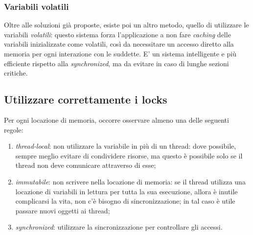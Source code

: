 \subsubsection{Variabili volatili}
Oltre alle soluzioni già proposte, esiste poi un altro metodo, quello di utilizzare le variabili \textit{volatili}: questo sistema forza l'applicazione a non fare \textit{caching} delle variabili inizializzate come volatili, così da necessitare un accesso diretto alla memoria per ogni interazione con le suddette. E' un sistema intelligente e più efficiente rispetto alla \textit{synchronized}, ma da evitare in caso di lunghe sezioni critiche.

\subsection{Utilizzare correttamente i locks}
Per ogni locazione di memoria, occorre osservare almeno una delle seguenti regole:
\begin{enumerate}
	\item \textit{thread-local}: non utilizzare la variabile in più di un thread:
	dove possibile, sempre meglio evitare di condividere risorse, ma questo è possibile solo se il thread non deve comunicare attraverso di esse;
	\item \textit{immutabile}: non scrivere nella locazione di memoria:
	se il thread utilizza una locazione di variabili in lettura per tutta la sua esecuzione, allora è inutile complicarsi la vita, non c'è bisogno di sincronizzazione; in tal caso è utile passare nuovi oggetti ai thread;
	\item \textit{synchronized}: utilizzare la sincronizzazione per controllare gli accessi.
\end{enumerate}

